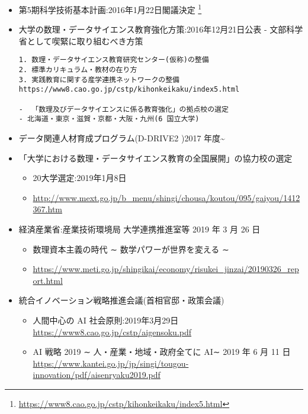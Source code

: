 \documentclass[
]{book}
\providecommand{\tightlist}{%
  \setlength{\itemsep}{0pt}\setlength{\parskip}{0pt}}
\theoremstyle{definition}
\theoremstyle{definition}
\theoremstyle{definition}
\theoremstyle{definition}
\theoremstyle{remark}
\begin{document}
\begin{itemize}
\item
  第5期科学技術基本計画:2016年1月22日閣議決定 \footnote{\url{https://www8.cao.go.jp/cstp/kihonkeikaku/index5.html}}
\item
  大学の数理・データサイエンス教育強化方策:2016年12月21日公表
  - 文部科学省として喫緊に取り組むべき方策

\begin{verbatim}
1. 数理・データサイエンス教育研究センター(仮称)の整備
2. 標準カリキュラム・教材の在り方
3. 実践教育に関する産学連携ネットワークの整備         
https://www8.cao.go.jp/cstp/kihonkeikaku/index5.html

-  「数理及びデータサイエンスに係る教育強化」の拠点校の選定 
- 北海道・東京・滋賀・京都・大阪・九州(6 国立大学)
\end{verbatim}
\item
  データ関連人材育成プログラム(D-DRIVE2 )2017 年度\textasciitilde{}
\item
  「大学における数理・データサイエンス教育の全国展開」の協力校の選定

  \begin{itemize}
  \tightlist
  \item
    20大学選定:2019年1月8日
  \item
    \url{http://www.mext.go.jp/b_menu/shingi/chousa/koutou/095/gaiyou/1412367.htm}
  \end{itemize}
\item
  経済産業省:産業技術環境局 大学連携推進室等 2019 年 3 月 26 日

  \begin{itemize}
  \item
    数理資本主義の時代 ∼ 数学パワーが世界を変える ∼
  \item
    \url{https://www.meti.go.jp/shingikai/economy/risukei_jinzai/20190326_report.html}
  \end{itemize}
\item
  統合イノベーション戦略推進会議(首相官邸・政策会議)

  \begin{itemize}
  \tightlist
  \item
    人間中心の AI 社会原則:2019年3月29日
    \url{https://www8.cao.go.jp/cstp/aigensoku.pdf}
  \item
    AI 戦略 2019 ∼ 人・産業・地域・政府全てに AI∼ 2019 年 6 月 11 日 \url{https://www.kantei.go.jp/jp/singi/tougou-innovation/pdf/aisenryaku2019.pdf}
  \end{itemize}
\end{itemize}
\end{document}
